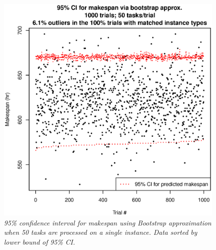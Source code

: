 \documentclass[12pt]{report}
\begin{document}
\begin{figure}
\includegraphics[width=1\textwidth]{validate-stochastic-runtimes-1000-trials-50-tasks.eps}
\caption{\textit{95\% confidence interval for makespan using Bootstrap approximation when 50 tasks are processed on a single instance. Data sorted by lower bound of 95\% CI.}}
\label{fig:validate-stochastic-runtimes-1000-trials-50-tasks}
\end{figure}
\end{document}
